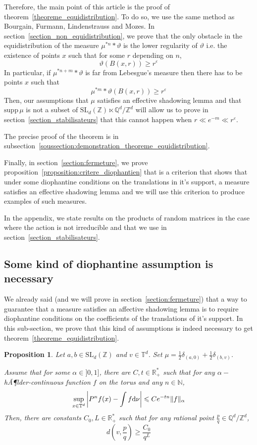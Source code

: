 \documentclass[11pt]{amsart}
\newtheorem{proposition}[theorem]{Proposition}
\theoremstyle{definition}
\theoremstyle{remark}
\numberwithin{equation}{section}
\begin{document}
\medskip
Therefore, the main point of this article is the proof of theorem~\ref{theoreme_equidistribution}. To do so, we use the same method as Bourgain, Furmann, Lindenstrauss and Mozes. In section~\ref{section_non_equidistribution}, we prove that the only obstacle in the equidistribution of the measure $\mu^{\ast n} \ast \vartheta$ is the lower regularity of $\vartheta$ i.e. the existence of points $x$ such that for some $r$ depending on $n$,
\[
\vartheta(B(x,r))\geqslant r^\varepsilon
\]
In particular, if $\mu^{\ast n+m} \ast \vartheta$ is far from Lebesgue's measure then there has to be points $x$ such that
\[
\mu^{\ast m}\ast \vartheta(B(x,r)) \geqslant r^\varepsilon
\]
Then, our assumptions that $\mu$ satisfies an effective shadowing lemma and that ${\mathrm{supp}\,}\mu$ is not a subset of $\mathrm{SL}_d({\mathbb Z}) \ltimes {\mathbb Q}^d/{\mathbb Z}^d$ will allow us to prove in section~\ref{section_stabilisateurs} that this cannot happen when $ r\ll e^{-m} \ll r^\varepsilon$.

The precise proof of the theorem is in subsection~\ref{soussection:demonstration_theoreme_equidistribution}.

\medskip
Finally, in section~\ref{section:fermeture}, we prove proposition~\ref{proposition:critere_diophantien} that is a criterion that shows that under some diophantine conditions on the translations in it's support, a measure satisfies an effective shadowing lemma and we will use this criterion to produce examples of such measures.  
 
\medskip
In the appendix, we state results on the products of random matrices in the case where the action is not irreducible and that we use in section~\ref{section_stabilisateurs}. 

\subsection{Some kind of diophantine assumption is necessary}

We already said (and we will prove in section~\ref{section:fermeture}) that a way to guarantee that a measure satisfies an affective shadowing lemma is to require diophantine conditions on the coefficients of the translations of it's support. In this sub-section, we prove that this kind of assumptions is indeed necessary to get theorem~\ref{theoreme_equidistribution}.

\begin{proposition}
Let $a,b\in \mathrm{SL}_d({\mathbb Z})$ and $v\in {\mathbb T}^d$. Set $\mu= \frac 1 2 \delta_{(a,0)} + \frac 12 \delta_{(b,v)}$.

Assume that for some $\alpha\in ]0,1]$, there are $C,t\in {\mathbb R}_+^\ast$ such that for any $\alpha-$hÃ¶lder-continuous function $f$ on the torus and any $n\in {\mathbb N}$,
\[
\sup_{x\in {\mathbb T}^d} \left|P^n f(x) - \int f{{\rm d}}\nu\right| \leqslant Ce^{-tn} \|f\|_\alpha
\]
Then, there are constants $C_0,L\in {\mathbb R}_+^\ast$ such that for any rational point $\frac pq \in {\mathbb Q}^d/{\mathbb Z}^d$,
\[
d\left(v,\frac p q \right)\geqslant \frac{C_0}{q^L}
\]
\end{proposition}
\end{document}
